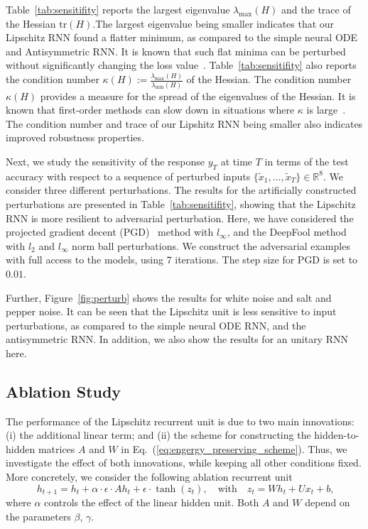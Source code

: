 \documentclass{article} \usepackage{iclr2021_conference,times}
\begin{document}
Table~\ref{tab:sensitifity} reports the largest eigenvalue $\lambda_{\max}(H)$ and the trace of the Hessian $\mathrm{tr}(H)$.The largest eigenvalue being smaller indicates that our Lipschitz RNN found a flatter minimum, as compared to the simple neural ODE and Antisymmetric RNN.
It is known that such flat minima can be perturbed without significantly changing the loss value~\citep{hochreiter1997flat}. 
Table~\ref{tab:sensitifity} also reports the condition number $\kappa(H) := \frac{\lambda_{\max}(H)}{\lambda_{\min}(H)}$ of the Hessian.
The condition number $\kappa(H)$ provides a measure for the spread of the eigenvalues of the Hessian.
It is known that first-order methods can slow down in situations where $\kappa$ is large~\citep{bottou2008tradeoffs}. 
The condition number and trace of our Lipshitz RNN being smaller also indicates improved robustness properties.


Next, we study the sensitivity of the response $y_T$ at time $T$ in terms of the test accuracy with respect to a sequence of perturbed inputs $\{\tilde{x}_1,\dots,\tilde{x}_T\} \in \mathbb{R}^{8}$. 
We consider three different perturbations. 
The results for the artificially constructed perturbations are presented in Table~\ref{tab:sensitifity}, showing that the Lipschitz RNN is more resilient to adversarial perturbation.
Here, we have considered the projected gradient decent (PGD)~\citep{goodfellow2014explaining} method with $l_\infty$, and the DeepFool method~\citep{moosavi2016deepfool} with $l_2$ and $l_\infty$ norm ball perturbations.
We construct the adversarial examples with full access to the models, using $7$ iterations. The step size for PGD is set to $0.01$.


Further, Figure~\ref{fig:perturb} shows the results for white noise and salt and pepper noise. It can be seen that the Lipschitz unit is less sensitive to input perturbations, as compared to the simple neural ODE RNN, and the antisymmetric RNN. In addition, we also show the results for an unitary RNN here.


\subsection{Ablation Study}\label{sec:ablation}


The performance of the Lipschitz recurrent unit is due to two main innovations: (i) the additional linear term; and (ii) the scheme for constructing the hidden-to-hidden matrices $A$ and $W$ in Eq.~(\ref{eq:engergy_preserving_scheme}).
Thus, we investigate the effect of both innovations, while keeping all other conditions fixed. More concretely, we consider the following ablation recurrent unit
\begin{equation}\
	h_{t+1} = h_{t} + \alpha \cdot \epsilon \cdot Ah_{t} + \epsilon \cdot \tanh(z_t), \quad \text{with} \quad z_t = Wh_{t} + Ux_t + b,
\end{equation}
where $\alpha$ controls the effect of the linear hidden unit. 
Both $A$ and $W$ depend on the parameters $\beta$, $\gamma$.
\end{document}
